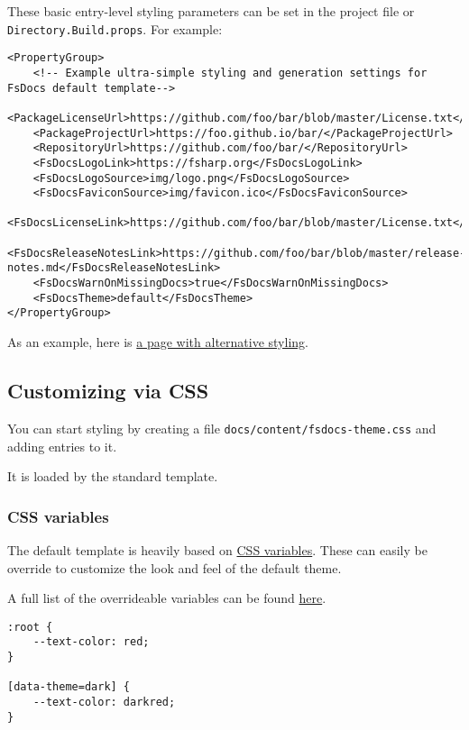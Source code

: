 \documentclass{article}
\begin{document}
These basic entry-level styling parameters can be set in the project file or \texttt{Directory.Build.props}.
For example:
\begin{lstlisting}
<PropertyGroup>
    <!-- Example ultra-simple styling and generation settings for FsDocs default template-->
    <PackageLicenseUrl>https://github.com/foo/bar/blob/master/License.txt</PackageLicenseUrl>
    <PackageProjectUrl>https://foo.github.io/bar/</PackageProjectUrl>
    <RepositoryUrl>https://github.com/foo/bar/</RepositoryUrl>
    <FsDocsLogoLink>https://fsharp.org</FsDocsLogoLink>
    <FsDocsLogoSource>img/logo.png</FsDocsLogoSource>
    <FsDocsFaviconSource>img/favicon.ico</FsDocsFaviconSource>
    <FsDocsLicenseLink>https://github.com/foo/bar/blob/master/License.txt</FsDocsLicenseLink>
    <FsDocsReleaseNotesLink>https://github.com/foo/bar/blob/master/release-notes.md</FsDocsReleaseNotesLink>
    <FsDocsWarnOnMissingDocs>true</FsDocsWarnOnMissingDocs>
    <FsDocsTheme>default</FsDocsTheme>
</PropertyGroup>

\end{lstlisting}


As an example, here is \href{templates/leftside/styling.html}{a page with alternative styling}.
\subsection*{Customizing via CSS}



You can start styling by creating a file \texttt{docs/content/fsdocs-theme.css} and adding entries to it.

It is loaded by the standard template.
\subsubsection*{CSS variables}



The default template is heavily based
on \href{https://developer.mozilla.org/en-US/docs/Web/CSS/Using\_CSS\_custom\_properties}{CSS variables}. These can easily be
override to customize the look and feel of the default theme.

A full list of the overrideable variables can be
found \href{https://github.com/fsprojects/FSharp.Formatting/blob/main/docs/content/fsdocs-default.css}{here}.
\begin{lstlisting}
:root {
    --text-color: red;
}

[data-theme=dark] {
    --text-color: darkred;
}

\end{lstlisting}
\end{document}

